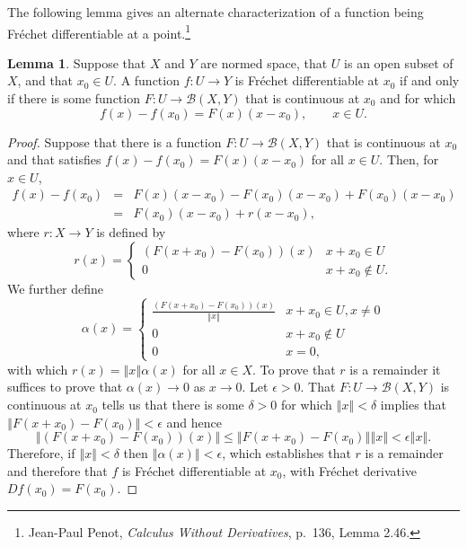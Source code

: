 \documentclass{article}
\newcommand{\norm}[1]{\left\Vert #1 \right\Vert}
\theoremstyle{definition}
\newtheorem{lemma}[theorem]{Lemma}
\theoremstyle{definition}
\begin{document}
The following lemma gives an alternate characterization of a function being Fr\'echet differentiable
at a point.\footnote{Jean-Paul Penot, {\em Calculus Without Derivatives}, p.~136, Lemma 2.46.}

\begin{lemma}
Suppose that $X$ and $Y$ are normed space, that $U$ is an open subset of $X$, and that $x_0 \in U$. A function
$f:U \to Y$ is Fr\'echet differentiable at $x_0$ if and only if there is some function
$F:U \to \mathscr{B}(X,Y)$ that is continuous at $x_0$ and for which
\[
f(x)-f(x_0)=F(x)(x-x_0), \qquad x \in U.
\]
\end{lemma}
\begin{proof}
Suppose that there is a function $F:U \to \mathscr{B}(X,Y)$ that is continuous at $x_0$ and that satisfies
$f(x)-f(x_0)=F(x)(x-x_0)$ for all $x \in U$. Then, for $x \in U$,
\begin{eqnarray*}
f(x)-f(x_0)&=&F(x)(x-x_0)-F(x_0)(x-x_0)+F(x_0)(x-x_0)\\
&=&F(x_0)(x-x_0)+r(x-x_0),
\end{eqnarray*}
where   $r:X \to Y$ is defined by
\[
r(x)=\begin{cases}
(F(x+x_0)-F(x_0))(x)&x+x_0 \in U\\
0&x+x_0 \not \in U.
\end{cases}
\]
We further define
\[
\alpha(x) = \begin{cases}
\frac{(F(x+x_0)-F(x_0))(x)}{\norm{x}}&x+x_0 \in U, x \neq 0\\
0&x+x_0 \not \in U\\
0&x=0,
\end{cases}
\]
with which $r(x)=\norm{x}\alpha(x)$ for all $x \in X$. To prove that $r$ is a remainder it suffices to prove that
$\alpha(x) \to 0$ as $x \to 0$. Let $\epsilon>0$.
That $F:U \to \mathscr{B}(X,Y)$ is continuous at $x_0$ tells us that there is some $\delta>0$ for which
$\norm{x}<\delta$ implies that $\norm{F(x+x_0)-F(x_0)}<\epsilon$ and hence 
\[
\norm{(F(x+x_0)-F(x_0))(x)} \leq \norm{F(x+x_0)-F(x_0)} \norm{x} < \epsilon \norm{x}.
\]
Therefore, if $\norm{x}<\delta$ then
$\norm{\alpha(x)} < \epsilon$, which establishes that $r$ is a remainder and therefore that
$f$ is Fr\'echet differentiable at $x_0$, with Fr\'echet derivative $Df(x_0)=F(x_0)$.


\end{proof}
\end{document}
